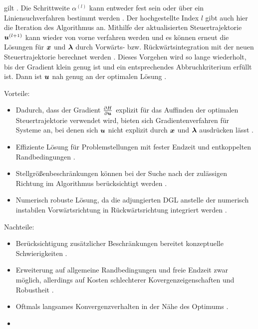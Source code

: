 gilt \cite{KnutGraichen.2012}. Die Schrittweite $\alpha^{(l)}$ kann entweder fest sein oder über ein Liniensuchverfahren bestimmt werden \cite{Papageorgiou.2012}. Der hochgestellte Index $l$ gibt auch hier die Iteration des Algorithmus an. Mithilfe der aktualisierten Steuertrajektorie $\boldsymbol{u}^{(l+1)}$ kann wieder von vorne verfahren werden und es können erneut die Lösungen für $\boldsymbol{x}$ und $\boldsymbol{\lambda}$ durch Vorwärts- bzw. Rückwärtsintegration mit der neuen Steuertrajektorie berechnet werden \cite{Papageorgiou.2012}. Dieses Vorgehen wird so lange wiederholt, bis der Gradient klein genug ist und ein entsprechendes Abbruchkriterium erfüllt ist. Dann ist $\boldsymbol{u}$ nah genug an der optimalen Lösung \cite{Papageorgiou.2012}.
\begin{multicols}{2}
	Vorteile:
	\begin{itemize}
		\item Dadurch, dass der Gradient $\frac{\partial H}{\partial \boldsymbol{u}}$ explizit für das Auffinden der optimalen Steuertrajektorie verwendet wird, bieten sich Gradientenverfahren für Systeme an, bei denen sich $\boldsymbol{u}$ nicht explizit durch $\boldsymbol{x}$ und $\boldsymbol{\lambda}$ ausdrücken lässt \cite{KnutGraichen.2012}.
		\item Effiziente Lösung für Problemstellungen mit fester Endzeit und entkoppelten Randbedingungen \cite{Papageorgiou.2012}.
		\item Stellgrößenbeschränkungen können bei der Suche nach der zulässigen Richtung im Algorithmus berücksichtigt werden \cite{Papageorgiou.2012}.
		\item Numerisch robuste Lösung, da die adjungierten \gls{DGL} anstelle der numerisch instabilen Vorwärtsrichtung in Rückwärtsrichtung integriert werden \cite{KnutGraichen.2012}.
	\end{itemize}
	
	\columnbreak
	
	Nachteile:
	\begin{itemize}
				\item Berücksichtigung zusätzlicher Beschränkungen bereitet konzeptuelle Schwierigkeiten \cite{Papageorgiou.2012}.\vspace{\fill}
				\item Erweiterung auf allgemeine Randbedingungen und freie Endzeit zwar möglich, allerdings auf Kosten schlechterer Kovergenzeigenschaften und Robustheit \cite{KnutGraichen.2012}.\vspace{\fill}
				\item Oftmals langsames Konvergenzverhalten in der Nähe des Optimums \cite{KnutGraichen.2012}.\vspace{\fill}
			    \item[\vspace{\fill}]
	\end{itemize}
\end{multicols}
